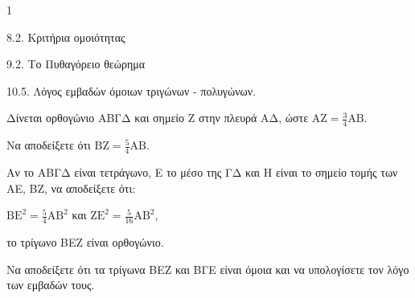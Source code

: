 \begin{ylh}{1}
    \item 8.2. Κριτήρια ομοιότητας
    \item 9.2. Το Πυθαγόρειο θεώρημα
    \item 10.5. Λόγος εμβαδών όμοιων τριγώνων - πολυγώνων.
\end{ylh}
\begin{figure}
\end{figure}
Δίνεται ορθογώνιο ΑΒΓΔ και σημείο Ζ στην πλευρά ΑΔ, ώστε $\text{AZ} = \frac{3}{4}\text{AB}$.
\begin{alist}
\item Να αποδείξετε ότι $\text{BZ} = \frac{5}{4}\text{AB}$. 
\item Αν το ΑΒΓΔ είναι τετράγωνο, Ε το μέσο της ΓΔ και Η είναι το σημείο τομής των ΑΕ, ΒΖ, να αποδείξετε ότι:
    \begin{rlist}
    \item $\text{BE}^2 = \frac{5}{4}\text{AB}^2$ και $\text{ZE}^2 = \frac{5}{16}\text{AB}^2$, 
    \item το τρίγωνο ΒΕΖ είναι ορθογώνιο. 
    \end{rlist}
\item Να αποδείξετε ότι τα τρίγωνα ΒΕΖ και ΒΓΕ είναι όμοια και να υπολογίσετε τον λόγο των εμβαδών τους. 
\end{alist}